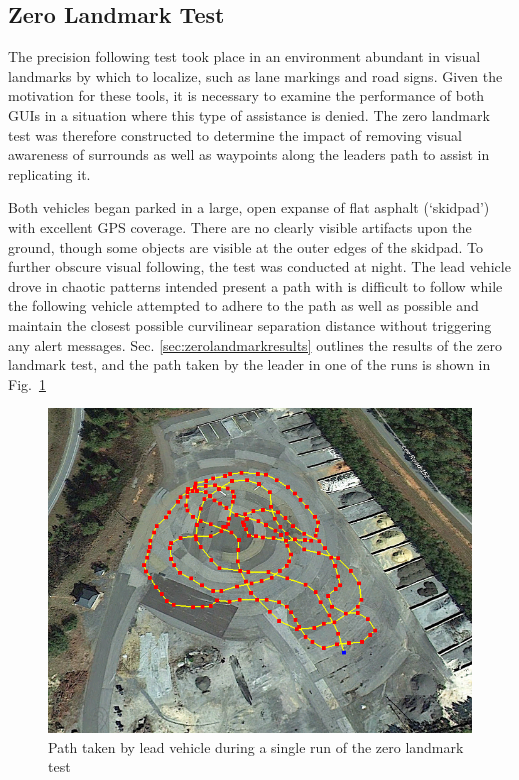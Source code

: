 \subsection{Zero Landmark Test} \label{sec:zerolandmarktest}
The precision following test took place in an environment abundant in visual landmarks by which to localize, such as lane markings and road signs. Given the motivation for these tools, it is necessary to examine the performance of both GUIs in a situation where this type of assistance is denied. The zero landmark test was therefore constructed to determine the impact of removing visual awareness of surrounds as well as waypoints along the leaders path to assist in replicating it.

Both vehicles began parked in a large, open expanse of flat asphalt (`skidpad') with excellent GPS coverage. There are no clearly visible artifacts upon the ground, though some objects are visible at the outer edges of the skidpad. To further obscure visual following, the test was conducted at night. The lead vehicle drove in chaotic patterns intended present a path with is difficult to follow while the following vehicle attempted to adhere to the path as well as possible and maintain the closest possible curvilinear separation distance without triggering any alert messages. Sec. \ref{sec:zerolandmarkresults} outlines the results of the zero landmark test, and the path taken by the leader in one of the runs is shown in Fig.~\ref{fig:zerolandmarkpath}

\begin{figure}[ht] \centering
    \includegraphics[width=5in]{./figs/zero_landmark_path.png}
    \caption{Path taken by lead vehicle during a single run of the zero landmark test} \label{fig:zerolandmarkpath}
\end{figure}






